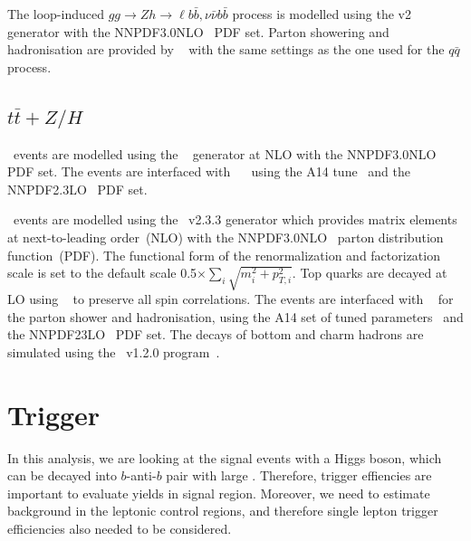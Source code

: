 \par The loop-induced $gg\to Zh \to \ell b\bar{b}, \nu\bar{\nu}b\bar{b}$ process is modelled using the \powhegbox v2 generator \cite{Alioli:2010xd} with the NNPDF3.0NLO~\cite{Ball:2014uwa} PDF set.
Parton showering and hadronisation are provided by \pythia~\cite{Sjostrand:2014zea} with the same settings as the one used for the $q\bar{q}$ process.

\subsection{$t\bar{t}+Z/H$}

\par \ttH~events are modelled using the \powhegbox~\cite{Frixione:2007nw,Nason:2004rx,Frixione:2007vw,Alioli:2010xd,Hartanto:2015uka}
generator at NLO with the NNPDF3.0NLO~\cite{Ball:2014uwa} PDF set.
The events are interfaced with \pythia~\cite{Sjostrand:2014zea}~ using the A14 tune~\cite{ATL-PHYS-PUB-2014-021} and the NNPDF2.3LO~\cite{Ball:2014uwa} PDF set.

\par \ttV~events are modelled using the \mgamc~v2.3.3 \cite{Alwall:2014hca} generator which provides matrix elements at next-to-leading order~(NLO) with the NNPDF3.0NLO~\cite{Ball:2014uwa} parton distribution function~(PDF).
The functional form of the renormalization and factorization scale is set to the default scale 0.5$\times \sum_i \sqrt{m^2_i+p^2_{T,i}}$.
Top quarks are decayed at LO using \madspin~\cite{Frixione:2007zp,Artoisenet:2012st} to preserve all spin correlations.
The events are interfaced with \pythia~\cite{Sjostrand:2014zea} for the parton shower and hadronisation,
using the A14 set of tuned parameters~\cite{ATL-PHYS-PUB-2014-021}  and the NNPDF23LO~\cite{Ball:2014uwa} PDF set.
The decays of bottom and charm hadrons are simulated using the \evtgen\ v1.2.0 program~\cite{EvtGen}.

\section{Trigger}
\label{sec:trigger}

\par In this analysis, we are looking at the signal events with a Higgs boson, which can be decayed into $b$-anti-$b$ pair with large \met. 
Therefore, \met trigger effiencies are important to evaluate yields in signal region. 
Moreover, we need to estimate background in the leptonic control regions, and therefore single lepton trigger efficiencies also needed to be considered.

